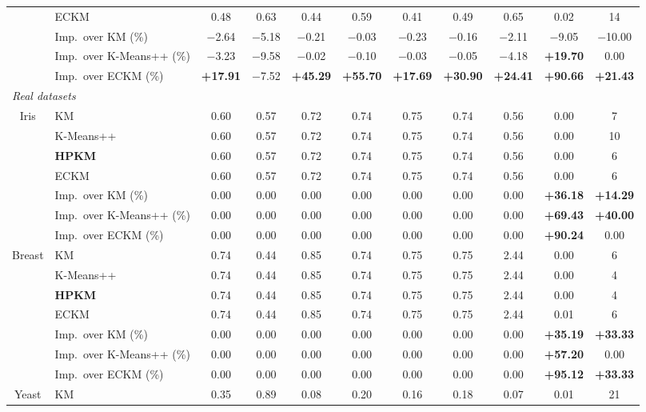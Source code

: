 \begin{table}[p]
\begin{adjustbox}{max width=\textwidth, max totalheight=0.86\textheight}
\begin{tabular}{|c|l|ccccccccc|}
 & ECKM & 0.48 & 0.63 & 0.44 & 0.59 & 0.41 & 0.49 & 0.65 & 0.02 & 14 \\
& Imp.\ over KM (\%) & $-$2.64 & $-$5.18 & $-$0.21 & $-$0.03 & $-$0.23 & $-$0.16 & $-$2.11 & $-$9.05 & $-$10.00 \\
& Imp.\ over K-Means++ (\%) & $-$3.23 & $-$9.58 & $-$0.02 & $-$0.10 & $-$0.03 & $-$0.05 & $-$4.18 & \textbf{+19.70} & 0.00 \\
& Imp.\ over ECKM (\%) & \textbf{+17.91} & $-$7.52 & \textbf{+45.29} & \textbf{+55.70} & \textbf{+17.69} & \textbf{+30.90} & \textbf{+24.41} & \textbf{+90.66} & \textbf{+21.43} \\
\hline
\multicolumn{11}{|l|}{\textit{Real datasets}} \\
\hline
Iris & KM & 0.60 & 0.57 & 0.72 & 0.74 & 0.75 & 0.74 & 0.56 & 0.00 & 7 \\
 & K-Means++ & 0.60 & 0.57 & 0.72 & 0.74 & 0.75 & 0.74 & 0.56 & 0.00 & 10 \\
 & \textbf{HPKM} & 0.60 & 0.57 & 0.72 & 0.74 & 0.75 & 0.74 & 0.56 & 0.00 & 6 \\
 & ECKM & 0.60 & 0.57 & 0.72 & 0.74 & 0.75 & 0.74 & 0.56 & 0.00 & 6 \\
& Imp.\ over KM (\%) & 0.00 & 0.00 & 0.00 & 0.00 & 0.00 & 0.00 & 0.00 & \textbf{+36.18} & \textbf{+14.29} \\
& Imp.\ over K-Means++ (\%) & 0.00 & 0.00 & 0.00 & 0.00 & 0.00 & 0.00 & 0.00 & \textbf{+69.43} & \textbf{+40.00} \\
& Imp.\ over ECKM (\%) & 0.00 & 0.00 & 0.00 & 0.00 & 0.00 & 0.00 & 0.00 & \textbf{+90.24} & 0.00 \\
\hline
Breast & KM & 0.74 & 0.44 & 0.85 & 0.74 & 0.75 & 0.75 & 2.44 & 0.00 & 6 \\
 & K-Means++ & 0.74 & 0.44 & 0.85 & 0.74 & 0.75 & 0.75 & 2.44 & 0.00 & 4 \\
 & \textbf{HPKM} & 0.74 & 0.44 & 0.85 & 0.74 & 0.75 & 0.75 & 2.44 & 0.00 & 4 \\
 & ECKM & 0.74 & 0.44 & 0.85 & 0.74 & 0.75 & 0.75 & 2.44 & 0.01 & 6 \\
& Imp.\ over KM (\%) & 0.00 & 0.00 & 0.00 & 0.00 & 0.00 & 0.00 & 0.00 & \textbf{+35.19} & \textbf{+33.33} \\
& Imp.\ over K-Means++ (\%) & 0.00 & 0.00 & 0.00 & 0.00 & 0.00 & 0.00 & 0.00 & \textbf{+57.20} & 0.00 \\
& Imp.\ over ECKM (\%) & 0.00 & 0.00 & 0.00 & 0.00 & 0.00 & 0.00 & 0.00 & \textbf{+95.12} & \textbf{+33.33} \\
\hline
Yeast & KM & 0.35 & 0.89 & 0.08 & 0.20 & 0.16 & 0.18 & 0.07 & 0.01 & 21 \\

\end{tabular}
\end{adjustbox}
\end{table}
